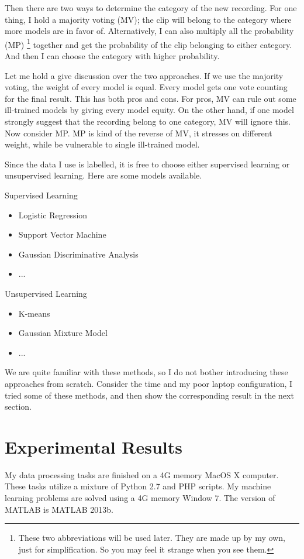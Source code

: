 \documentclass{sig-alternate}
\begin{document}
Then there are two ways to determine the category of the new recording. For one thing, I hold a majority voting (MV); the clip will belong to the category where more models are in favor of. Alternatively, I can also multiply all the probability (MP) \footnote{These two abbreviations will be used later. They are made up by my own, just for simplification. So you may feel it strange when you see them.}  together and get the probability of the clip belonging to either category. And then I can choose the category with higher probability.

Let me hold a give discussion over the two approaches. If we use the majority voting, the weight of every model is equal. Every model gets one vote counting for the final result. This has both pros and cons. For pros, MV can rule out some ill-trained models by giving every model equity. On the other hand, if one model strongly suggest that the recording belong to one category, MV will ignore this. Now consider MP. MP is kind of the reverse of MV, it stresses on different weight, while be vulnerable to single ill-trained model.

Since the data I use is labelled, it is free to choose either supervised learning or unsupervised learning. Here are some models available.

Supervised Learning
\begin{itemize}
	\item Logistic Regression
	\item Support Vector Machine
    \item Gaussian Discriminative Analysis
    \item ...
\end{itemize}

Unsupervised Learning
\begin{itemize}
	\item K-means
    \item Gaussian Mixture Model
    \item ...
\end{itemize}

We are quite familiar with these methods, so I do not bother introducing these approaches from scratch. Consider the time and my poor laptop configuration, I tried some of these methods, and then show the corresponding result in the next section.




\section{Experimental Results}
My data processing tasks are finished on a 4G memory MacOS X computer. These tasks utilize a mixture of Python 2.7 and PHP scripts. My machine learning problems are solved using a 4G memory Window 7. The version of MATLAB is MATLAB 2013b.
\end{document}
